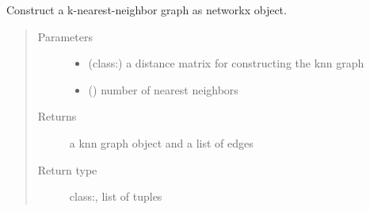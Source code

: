 \documentclass[letterpaper,10pt,english]{sphinxmanual}
\begin{document}

\begin{fulllineitems}
\label{\detokenize{api:spaotsc.SpaOTsc.knn_graph_nx}}
Construct a k-nearest-neighbor graph as networkx object.
\begin{quote}\begin{description}
\item[{Parameters}] \leavevmode\begin{itemize}
\item {} 
 (class:) \textendash{} a distance matrix for constructing the knn graph

\item {} 
 () \textendash{} number of nearest neighbors

\end{itemize}

\item[{Returns}] \leavevmode
a knn graph object and a list of edges

\item[{Return type}] \leavevmode
class:, list of tuples

\end{description}\end{quote}

\end{fulllineitems}

\end{document}
